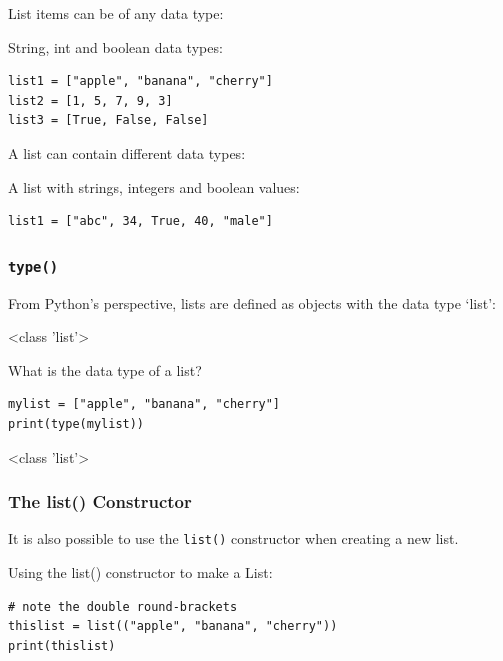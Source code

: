 \documentclass[12pt,a4paper]{article}
\newcommand{\code}[1]{%
	\colorbox{backcolour}{\lstinline{#1}}%
}
\newcommand{\lcode}[1]{%
	\lstinline{#1}%
}
\begin{document}
List items can be of any data type:

\begin{ebox}
String, int and boolean data types:
	\begin{lstlisting}
list1 = ["apple", "banana", "cherry"]
list2 = [1, 5, 7, 9, 3]
list3 = [True, False, False]
	\end{lstlisting}
\end{ebox}

A list can contain different data types:

\begin{ebox}
A list with strings, integers and boolean values:
	\begin{lstlisting}
list1 = ["abc", 34, True, 40, "male"]
	\end{lstlisting}
\end{ebox}
\subsubsection{\lcode{type()}}

From Python's perspective, lists are defined as objects with the data type `list':

\begin{vercode}
<class 'list'>
\end{vercode}

\begin{ebox}
What is the data type of a list?
	\begin{lstlisting}
mylist = ["apple", "banana", "cherry"]
print(type(mylist))
	\end{lstlisting}
\tcblower
	\begin{vercode}
<class 'list'>
	\end{vercode}
\end{ebox}
\subsubsection{The list() Constructor}

It is also possible to use the \code{list()} constructor
when creating a new list.

\begin{ebox}
Using the list() constructor to make a List:
	\begin{lstlisting}
# note the double round-brackets
thislist = list(("apple", "banana", "cherry"))
print(thislist)
	\end{lstlisting}
\tcblower
	\begin{vercode}
	\end{vercode}
\end{ebox}
\end{document}
